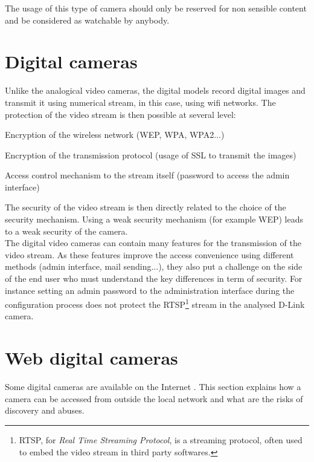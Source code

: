The usage of this type of camera should only be reserved for non sensible content and be considered as watchable by anybody.

\section{Digital cameras}
\label{sec:cam-digital}

Unlike the analogical video cameras, the digital models record digital images and transmit it using numerical stream, in this case, using wifi networks.
The protection of the video stream is then possible at several level:\\

\begin{itemizealt}
\item Encryption of the wireless network (WEP, WPA, WPA2...)
\item Encryption of the transmission protocol (usage of SSL to transmit the images)
\item Access control mechanism to the stream itself (password to access the admin interface)
\end{itemizealt}

The security of the video stream is then directly related to the choice of the security mechanism.
Using a weak security mechanism (for example WEP) leads to a weak security of the camera.\\

The digital video cameras can contain many features for the transmission of the video stream.
As these features improve the access convenience using different methods (admin interface, mail sending...), they also put a challenge on the side of the end user who must understand the key differences in term of security.
For instance setting an admin password to the administration interface during the configuration process does not protect the RTSP\footnote{RTSP, for \emph{Real Time Streaming Protocol}, is a streaming protocol, often used to embed the video stream in third party softwares.} stream in the analysed D-Link camera.

\section{Web digital cameras}
\label{sec:cam-google}

Some digital cameras are available on the Internet .
This section explains how a camera can be accessed from outside the local network and what are the risks of discovery and abuses.

